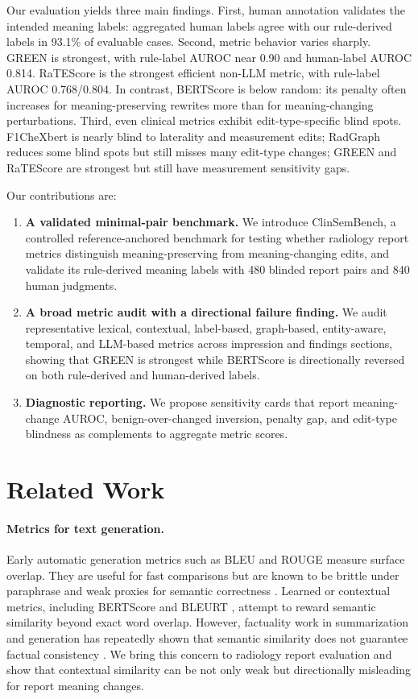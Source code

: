 \documentclass[11pt]{article}
\newcommand{\bench}{ClinSemBench\xspace}
\newcommand{\pres}{meaning-preserving\xspace}
\newcommand{\chg}{meaning-changing\xspace}
\begin{document}
Our evaluation yields three main findings. First, human annotation validates the intended meaning labels: aggregated human labels agree with our rule-derived labels in 93.1\% of evaluable cases. Second, metric behavior varies sharply. GREEN is strongest, with rule-label AUROC near 0.90 and human-label AUROC 0.814. RaTEScore is the strongest efficient non-LLM metric, with rule-label AUROC 0.768/0.804. In contrast, BERTScore is below random: its penalty often increases for meaning-preserving rewrites more than for meaning-changing perturbations. Third, even clinical metrics exhibit edit-type-specific blind spots. F1CheXbert is nearly blind to laterality and measurement edits; RadGraph reduces some blind spots but still misses many edit-type changes; GREEN and RaTEScore are strongest but still have measurement sensitivity gaps.

Our contributions are:
\begin{enumerate}[leftmargin=*,noitemsep]
    \item \textbf{A validated minimal-pair benchmark.} We introduce \bench, a controlled reference-anchored benchmark for testing whether radiology report metrics distinguish \pres from \chg edits, and validate its rule-derived meaning labels with 480 blinded report pairs and 840 human judgments.
    \item \textbf{A broad metric audit with a directional failure finding.} We audit representative lexical, contextual, label-based, graph-based, entity-aware, temporal, and LLM-based metrics across impression and findings sections, showing that GREEN is strongest while BERTScore is directionally reversed on both rule-derived and human-derived labels.
    \item \textbf{Diagnostic reporting.} We propose sensitivity cards that report meaning-change AUROC, benign-over-changed inversion, penalty gap, and edit-type blindness as complements to aggregate metric scores.
\end{enumerate}

\section{Related Work}

\paragraph{Metrics for text generation.}
Early automatic generation metrics such as BLEU \citep{papineni-etal-2002-bleu} and ROUGE \citep{lin-2004-rouge} measure surface overlap. They are useful for fast comparisons but are known to be brittle under paraphrase and weak proxies for semantic correctness \citep{reiter-belz-2009}. Learned or contextual metrics, including BERTScore \citep{zhang-etal-2020-bertscore} and BLEURT \citep{sellam-etal-2020-bleurt}, attempt to reward semantic similarity beyond exact word overlap. However, factuality work in summarization and generation has repeatedly shown that semantic similarity does not guarantee factual consistency \citep{maynez-etal-2020-faithfulness}. We bring this concern to radiology report evaluation and show that contextual similarity can be not only weak but directionally misleading for report meaning changes.
\end{document}
